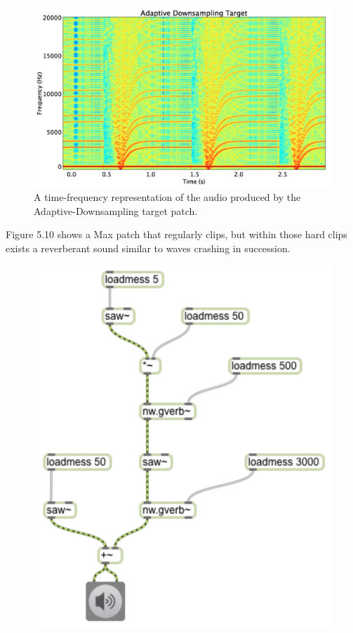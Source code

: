 \documentclass[a4paper,12pt]{report} 	%
\numberwithin{figure}{chapter}
\numberwithin{table}{chapter}
\numberwithin{equation}{chapter}
\begin{document}
\begin{flushleft}
\begin{figure}[h!]
\begin{center}
\includegraphics[width=\linewidth]{AdaptiveDownsamplingTargetSTFT}
\caption[Adaptive Downsampling Time-Frequency Representation]{A time-frequency representation of the audio produced by the Adaptive-Downsampling target patch.}
\end{center}
\end{figure}
Figure 5.10 shows a Max patch that regularly clips, but within those hard clips exists a reverberant sound similar to waves crashing in succession. 
\begin{figure}[h!]
\begin{center}
\includegraphics[scale=0.8]{ClippingReverbSaw}

\end{center}
\end{figure}
\end{flushleft}
\end{document}
